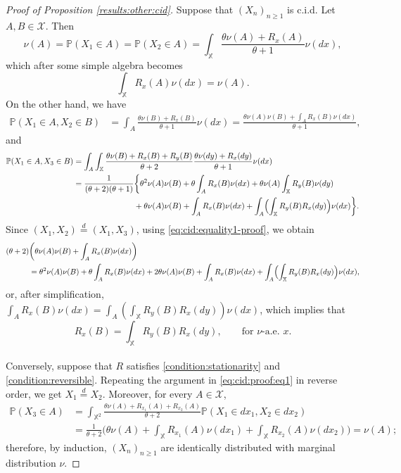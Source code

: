 \documentclass[10pt,a4paper]{amsart}
\begin{document}
\begin{proof}[Proof of Proposition \ref{results:other:cid}]
Suppose that $(X_n)_{n\geq1}$ is c.i.d. Let $A,B\in\mathcal{X}$. Then
\begin{equation}\label{eq:cid:proof:eq1}
\nu(A)=\mathbb{P}(X_1\in A)=\mathbb{P}(X_2\in A)=\int_\mathbb{X}\frac{\theta\nu(A)+R_x(A)}{\theta+1}\nu(dx),
\end{equation}
which after some simple algebra becomes
\begin{equation}\label{eq:cid:equality1-proof}
\int_\mathbb{X}R_x(A)\nu(dx)=\nu(A).
\end{equation}
On the other hand, we have
\begingroup\allowdisplaybreaks
\begin{align*}
\mathbb{P}(X_1\in A,X_2\in B)&=\int_A\frac{\theta\nu(B)+R_x(B)}{\theta+1}\nu(dx)=\frac{\theta\nu(A)\nu(B)+\int_AR_x(B)\nu(dx)}{\theta+1},
\end{align*}
\endgroup
and
\begingroup\allowdisplaybreaks
\begin{align*}
\mathbb{P}(X_1\in A,X_3\in B)&=\int_A\int_\mathbb{X}\frac{\theta\nu(B)+R_x(B)+R_y(B)}{\theta+2}\frac{\theta\nu(dy)+R_x(dy)}{\theta+1}\nu(dx)\\
&\begin{aligned}\;=\frac{1}{(\theta+2)(\theta+1)}&\biggl\{\theta^2\nu(A)\nu(B)+\theta\int_AR_x(B)\nu(dx)+\theta\nu(A)\int_\mathbb{X}R_y(B)\nu(dy)\\
&+\theta\nu(A)\nu(B)+\int_AR_x(B)\nu(dx)+\int_A\Bigl(\int_\mathbb{X}R_y(B)R_x(dy)\Bigr)\nu(dx)\biggr\}.\end{aligned}
\end{align*}
\endgroup
Since $(X_1,X_2)\overset{d}{=}(X_1,X_3)$, using \eqref{eq:cid:equality1-proof}, we obtain
\begingroup\allowdisplaybreaks
\begin{align*}
(\theta+2)&\biggl(\theta\nu(A)\nu(B)+\int_AR_x(B)\nu(dx)\biggr)\\
&=\theta^2\nu(A)\nu(B)+\theta\int_AR_x(B)\nu(dx)+2\theta\nu(A)\nu(B)+\int_AR_x(B)\nu(dx)+\int_A\Bigl(\int_\mathbb{X}R_y(B)R_x(dy)\Bigr)\nu(dx),
\end{align*}
\endgroup
or, after simplification, $\int_AR_x(B)\nu(dx)=\int_A(\int_\mathbb{X}R_y(B)R_x(dy))\nu(dx)$,
which implies that
\[R_x(B)=\int_\mathbb{X}R_y(B)R_x(dy),\qquad\mbox{for }\nu\mbox{-a.e. }x.\]\\

Conversely, suppose that $R$ satisfies \eqref{condition:stationarity} and \eqref{condition:reversible}. Repeating the argument in \eqref{eq:cid:proof:eq1} in reverse order, we get $X_1\overset{d}{=}X_2$. Moreover, for every $A\in\mathcal{X}$,
\begingroup\allowdisplaybreaks
\begin{align*}
\mathbb{P}(X_3\in A)&=\int_{\mathbb{X}^2}\frac{\theta\nu(A)+R_{x_1}(A)+R_{x_2}(A)}{\theta+2}\mathbb{P}(X_1\in dx_1,X_2\in dx_2)\\
&=\frac{1}{\theta+2}\biggl(\theta\nu(A)+\int_\mathbb{X}R_{x_1}(A)\nu(dx_1)+\int_\mathbb{X}R_{x_2}(A)\nu(dx_2)\biggr)=\nu(A);
\end{align*}
\endgroup
therefore, by induction, $(X_n)_{n\geq1}$ are identically distributed with marginal distribution $\nu$.


\end{proof}
\end{document}
